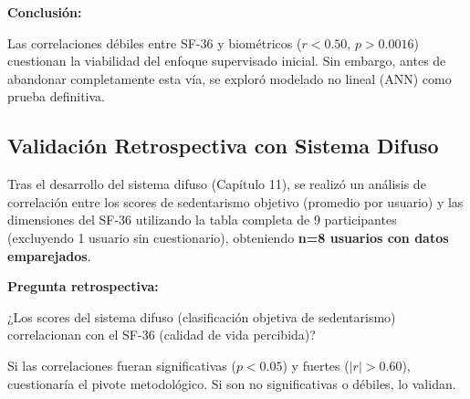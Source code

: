 \documentclass[12pt,letterpaper,twoside]{report}
\begin{document}
\begin{conclusionbox}
\textbf{Conclusión:}

Las correlaciones débiles entre SF-36 y biométricos ($r < 0.50$, $p > 0.0016$) cuestionan la viabilidad del enfoque supervisado inicial. Sin embargo, antes de abandonar completamente esta vía, se exploró modelado no lineal (ANN) como prueba definitiva.
\end{conclusionbox}

\subsection{Validación Retrospectiva con Sistema Difuso}

Tras el desarrollo del sistema difuso (Capítulo 11), se realizó un análisis de correlación entre los scores de sedentarismo objetivo (promedio por usuario) y las dimensiones del SF-36 utilizando la tabla completa de 9 participantes (excluyendo 1 usuario sin cuestionario), obteniendo \textbf{n=8 usuarios con datos emparejados}.

\begin{hipotesisbox}
\textbf{Pregunta retrospectiva:}

¿Los scores del sistema difuso (clasificación objetiva de sedentarismo) correlacionan con el SF-36 (calidad de vida percibida)?

Si las correlaciones fueran significativas ($p < 0.05$) y fuertes ($|r| > 0.60$), cuestionaría el pivote metodológico. Si son no significativas o débiles, lo validan.
\end{hipotesisbox}
\end{document}
